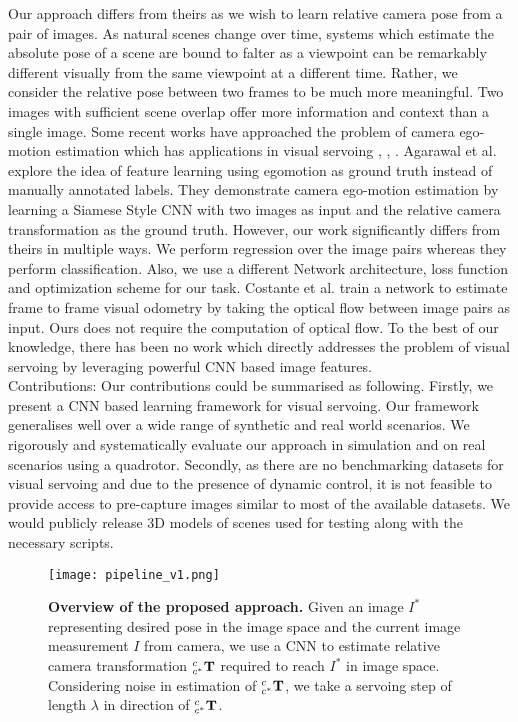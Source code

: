 \documentclass[usletter, 10 pt, conference]{ieeeconf}  %
\begin{document}
Our approach differs from theirs as we wish to learn relative camera pose from a pair of images. As natural scenes change over time, systems which estimate the absolute pose of a scene are bound to falter as a viewpoint can be remarkably different visually from the same viewpoint at a different time. Rather, we consider the relative pose between two frames to be much more meaningful. Two images with sufficient scene overlap offer more information and context than a single image. Some recent works have approached the problem of camera ego-motion estimation which has applications in visual servoing \cite{agrawal2015learning}, \cite{costante2016exploring}, \cite{konda2015learning}. Agarawal et al. \cite{agrawal2015learning} explore the idea of feature learning using egomotion as ground truth instead of manually annotated labels. They demonstrate camera ego-motion estimation by learning a Siamese Style CNN with two images as input and the relative camera transformation as the ground truth. However, our work significantly differs from theirs in multiple ways. We perform regression over the image pairs whereas they perform classification. Also, we use a different Network architecture, loss function and optimization scheme for our task. Costante et al. \cite{costante2016exploring} train a network to estimate frame to frame visual odometry by taking the optical flow between image pairs as input. Ours does not require the computation of optical flow. To the best of our knowledge, there has been no work which directly addresses the problem of visual servoing by leveraging powerful CNN based image features.\\  
\indent Contributions: Our contributions could be summarised as following.
 Firstly, we present a CNN based learning framework for visual servoing. Our framework generalises well over a wide range of synthetic and real world scenarios. We rigorously and systematically evaluate our approach in simulation and on real scenarios using a quadrotor.
 Secondly, as there are no benchmarking datasets for visual servoing and due to the presence of dynamic control, it is not feasible to provide access to pre-capture images similar to most of the available datasets. We would publicly release $3$D models of scenes used for testing along with the necessary scripts.



\begin{figure}[t!]
\begin{center}
\texttt{[image: pipeline\_v1.png]}
\vspace{-1.50em}
\caption{\textbf{Overview of the proposed approach.} Given an image $I^*$ representing desired pose in the image space and the current image measurement $I$ from camera, we use a CNN to estimate relative camera transformation $_{c^*}^{c}\textrm{\textbf{T}}$ required to reach $I^*$ in image space. Considering noise in estimation of $_{c^*}^{c}\textrm{\textbf{T}}$, we take a servoing step of length $\lambda$ in direction of $_{c^*}^{c}\textrm{\textbf{T}}$. }
\label{fig:overview}
\end{center}
\vspace{-1.0em}
\end{figure}
\end{document}
